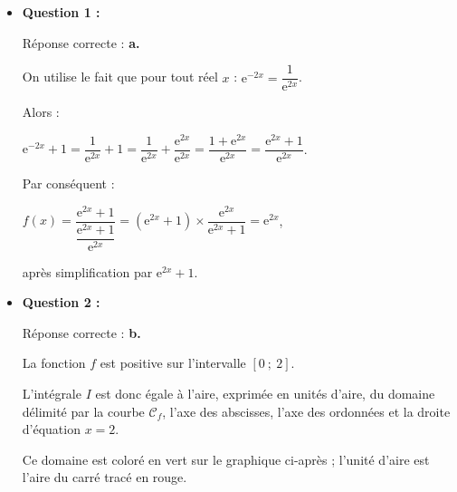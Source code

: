 \begin{corrige}
     \begin{itemize}
          \item \textbf{Question 1 :}
          \par
          Réponse correcte :\quad\textbf{ a.}
          \par
          On utilise le fait que pour tout réel $x$ : ${\text{e}^{-2x}=\dfrac{1}{\text{e}^{2x}}}$.
          \par
          Alors :
          \par
          $\text{e}^{-2x}+1=\dfrac{1}{\text{e}^{2x}}+1=\dfrac{1}{\text{e}^{2x}}+\dfrac{\text{e}^{2x}}{\text{e}^{2x}}=\dfrac{1+\text{e}^{2x}}{\text{e}^{2x}}=\dfrac{\text{e}^{2x}+1}{\text{e}^{2x}}$.
          \par
          \vspace{2mm}
          Par conséquent :
          \par
          $f(x)=\dfrac{\text{e}^{2x}+1}{\dfrac{\text{e}^{2x}+1}{\text{e}^{2x}}}=(\text{e}^{2x}+1) \times {\dfrac{\text{e}^{2x}}{\text{e}^{2x}+1}}=\text{e}^{2x}$,
          \par
          après simplification par ${\text{e}^{2x}+1}$.
          \par
          \par
          \item \textbf{Question 2 :}
          \par
          Réponse correcte :\quad\textbf{ b.}
          \par
          La fonction $f$ est positive sur l'intervalle $[0~;~2]$.
          \par
          L'intégrale $I$ est donc égale à l'aire, exprimée en unités d'aire, du domaine délimité par la courbe $\mathscr{C}_f$, l'axe des abscisses, l'axe des ordonnées et la droite d'équation $x=2$.
          \par
          Ce domaine est coloré en vert sur le graphique ci-après ; l'unité d'aire est l'aire du carré tracé en rouge.
          \par
          \begin{center}

\end{center}
\end{itemize}
\end{corrige}
